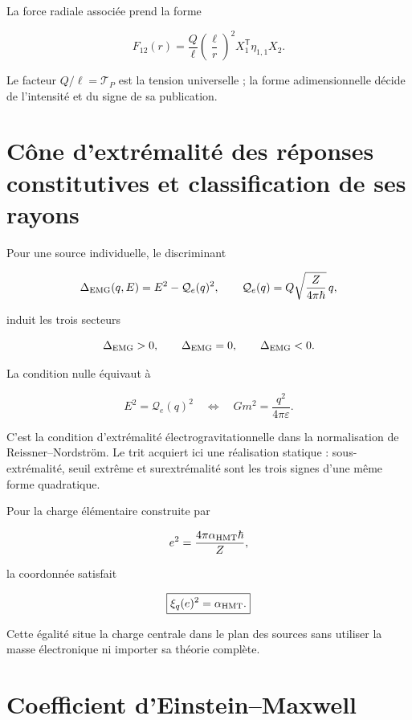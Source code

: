 La force radiale associée prend la forme

\begin{equation}
F_{12}(r)=\frac{Q}{\ell}
\left(\frac{\ell}{r}\right)^2
X_1^{\mathsf T}\eta_{1,1}X_2.
\label{eq:rm-emg-force}
\end{equation}

Le facteur \(Q/\ell=\mathscr T_P\) est la tension universelle ; la forme
adimensionnelle décide de l'intensité et du signe de sa publication.

\section{Cône d'extrémalité des réponses constitutives et classification de ses rayons}

Pour une source individuelle, le discriminant

\[
\Delta_{\rm EMG}(q,E)=E^2-\mathcal Q_e(q)^2,
\qquad
\mathcal Q_e(q)=Q\sqrt{\frac{Z}{4\pi\hbar}}\,q,
\]

induit les trois secteurs

\[
\Delta_{\rm EMG}>0,
\qquad
\Delta_{\rm EMG}=0,
\qquad
\Delta_{\rm EMG}<0.
\]

La condition nulle équivaut à

\begin{equation}
E^2=\mathcal Q_e(q)^2
\quad\Longleftrightarrow\quad
Gm^2=\frac{q^2}{4\pi\varepsilon}.
\label{eq:rm-rn-extremality}
\end{equation}

C'est la condition d'extrémalité électrogravitationnelle dans la normalisation de
Reissner--Nordström. Le trit acquiert ici une réalisation statique :
sous-extrémalité, seuil extrême et surextrémalité sont les trois signes d'une
même forme quadratique.

Pour la charge élémentaire construite par

\[
e^2=\frac{4\pi\alpha_{\rm HMT}\hbar}{Z},
\]

la coordonnée satisfait

\begin{equation}
\boxed{\xi_q(e)^2=\alpha_{\rm HMT}.}
\label{eq:rm-electron-electric-coordinate}
\end{equation}

Cette égalité situe la charge centrale dans le plan des sources sans utiliser la
masse électronique ni importer sa théorie complète.

\section{Coefficient d'Einstein--Maxwell}

